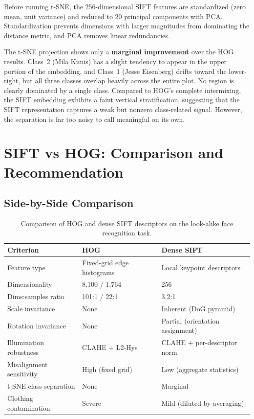 \documentclass[a4paper,10pt]{article}
\begin{document}
Before running t-SNE, the 256-dimensional SIFT features are standardized (zero mean, unit variance) and reduced to 20 principal components with PCA.
Standardization prevents dimensions with larger magnitudes from dominating the distance metric, and PCA removes linear redundancies.

The t-SNE projection shows only a \textbf{marginal improvement} over the HOG results.
Class~2 (Mila Kunis) has a slight tendency to appear in the upper portion of the embedding, and Class~1 (Jesse Eisenberg) drifts toward the lower-right, but all three classes overlap heavily across the entire plot.
No region is clearly dominated by a single class.
Compared to HOG's complete intermixing, the SIFT embedding exhibits a faint vertical stratification, suggesting that the SIFT representation captures a weak but nonzero class-related signal.
However, the separation is far too noisy to call meaningful on its own.

\section{SIFT vs HOG: Comparison and Recommendation}

\subsection{Side-by-Side Comparison}

\begin{table}[ht]
\centering
\begin{tabular}{l l l}
\hline
\textbf{Criterion} & \textbf{HOG} & \textbf{Dense SIFT} \\
\hline
Feature type & Fixed-grid edge histograms & Local keypoint descriptors \\
Dimensionality & 8{,}100 / 1{,}764 & 256 \\
Dims:samples ratio & 101:1 / 22:1 & 3.2:1 \\
Scale invariance & None & Inherent (DoG pyramid) \\
Rotation invariance & None & Partial (orientation assignment) \\
Illumination robustness & CLAHE + L2-Hys & CLAHE + per-descriptor norm \\
Misalignment sensitivity & High (fixed grid) & Low (aggregate statistics) \\
t-SNE class separation & None & Marginal \\
Clothing contamination & Severe & Mild (diluted by averaging) \\
\hline
\end{tabular}
\caption{Comparison of HOG and dense SIFT descriptors on the look-alike face recognition task.}
\label{tab:sift_vs_hog}
\end{table}
\end{document}
